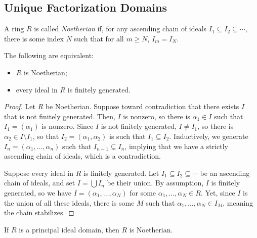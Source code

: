 \documentclass[10pt]{mypackage}
\begin{document}
\subsection{Unique Factorization Domains}%
\begin{definition}
  A ring $R$ is called \textit{Noetherian} if, for any ascending chain of ideals $I_1\subseteq I_2\subseteq\cdots$, there is some index $N$ such that for all $m\geq N$, $I_m = I_N$.
\end{definition}
\begin{proposition}
  The following are equivalent:
  \begin{itemize}
    \item $R$ is Noetherian;
    \item every ideal in $R$ is finitely generated.
  \end{itemize}
\end{proposition}
\begin{proof}
  Let $R$ be Noetherian. Suppose toward contradiction that there exists $I$ that is not finitely generated. Then, $I$ is nonzero, so there is $\alpha_1\in I$ such that $I_1 = \left( \alpha_1 \right)$ is nonzero. Since $I$ is not finitely generated, $I\neq I_1$, so there is $\alpha_2\in I\setminus I_1$, so that $I_2 = \left( \alpha_1,\alpha_2 \right)$ is such that $I_1\subseteq I_2$. Inductively, we generate $I_n = \left( \alpha_1,\dots,\alpha_n \right)$ such that $I_{n-1}\subsetneq I_n$, implying that we have a strictly ascending chain of ideals, which is a contradiction.\newline

  Suppose every ideal in $R$ is finitely generated. Let $I_1\subseteq I_2\subseteq\cdots$ be an ascending chain of ideals, and set $I = \bigcup I_n$ be their union. By assumption, $I$ is finitely generated, so we have $I = \left( \alpha_1,\dots,\alpha_N \right)$ for some $\alpha_1,\dots,\alpha_N\in R$. Yet, since $I$ is the union of all these ideals, there is some $M$ such that $\alpha_1,\dots,\alpha_N\in I_M$, meaning the chain stabilizes.
\end{proof}
\begin{corollary}
  If $R$ is a principal ideal domain, then $R$ is Noetherian.
\end{corollary}
\end{document}
